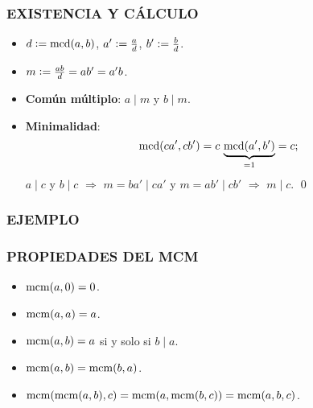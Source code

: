 \begin{frame}
  \frametitle{EXISTENCIA Y CÁLCULO}



  \begin{itemize}
  \item<4-> $d \mathrel{\mathop:}= \operatorname{mcd} (a,b)$, $a' \mathrel{\mathop:}= \frac{a}{d}$, $b' \mathrel{\mathop:}= \frac{b}{d}$.

  \item<5-> $m \mathrel{\mathop:}= \frac{ab}{d} = ab' = a'b$.

  \item<6-> \textbf{Común múltiplo}: $a\mid m$ y $b\mid m$.

  \item<7-> \textbf{Minimalidad}:
    $$\operatorname{mcd} (ca', cb') = c\,\underbrace{\operatorname{mcd} (a',b')}_{= 1} = c;$$
    $a\mid c$ y $b\mid c$ $\Longrightarrow$
    $m = ba' \mid ca'$ y $m = ab' \mid cb'$ $\Longrightarrow$
    $m \mid c$. \qed
  \end{itemize}
\end{frame}

\begin{frame}
  \frametitle{EJEMPLO}


 
\end{frame}

\begin{frame}
  \frametitle{PROPIEDADES DEL MCM}

  \begin{itemize}
  \item<2-> $\operatorname{mcm} (a,0) = 0$.

  \item<3-> $\operatorname{mcm} (a,a) = a$.

  \item<4-> $\operatorname{mcm} (a,b) = a$ si y solo si $b\mid a$.

  \item<5-> $\operatorname{mcm} (a,b) = \operatorname{mcm} (b,a)$.

  \item<6-> $\operatorname{mcm} (\operatorname{mcm} (a,b), c) = \operatorname{mcm} (a, \operatorname{mcm} (b,c)) = \operatorname{mcm} (a,b,c)$.
  \end{itemize}

\end{frame}

